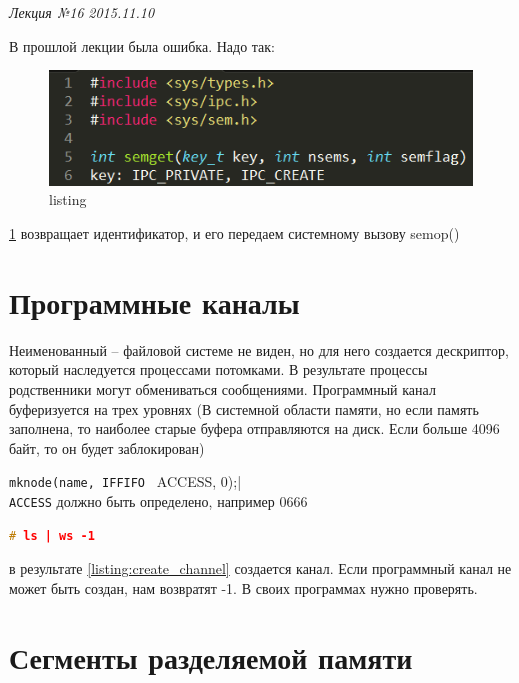 \clearpage
\begin{flushright}
	\textit{Лекция №16}
	\textit{2015.11.10}
\end{flushright}

В прошлой лекции была ошибка. Надо так:
\begin{figure}[H]
    \centering
    \includegraphics[width=\textwidth]{listing/1.png}
    \caption{listing}
    \label{listing:semget}
\end{figure}

\ref{listing:semget} возвращает идентификатор, и его передаем системному вызову semop()

\section{Программные каналы}

Неименованный – файловой системе не виден, но для него создается дескриптор, который наследуется процессами потомками. В результате процессы родственники могут обмениваться сообщениями. Программный канал буферизуется на трех уровнях (В системной области памяти, но если память заполнена, то наиболее старые буфера отправляются на диск. Если больше 4096 байт, то он будет заблокирован)

\verb|mknode(name, IFFIFO | ACCESS, 0);|\\
\verb|ACCESS| должно быть определено, например 0666

\begin{lstlisting}[language=c, caption = Создание канала, label = listing:create_channel]
# ls | ws -1
\end{lstlisting}

в результате \ref{listing:create_channel} создается канал. Если программный канал не может быть создан, нам возвратят -1. В своих программах нужно проверять.

\section{Сегменты разделяемой памяти}

